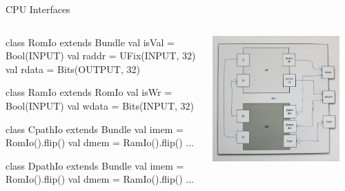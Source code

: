 \documentclass[xcolor=pdflatex,dvipsnames,table]{beamer}
\begin{document}
\begin{frame}[fragile]{CPU Interfaces}
\begin{columns}

\begin{scala}
class RomIo extends Bundle {
  val isVal = Bool(INPUT)
  val raddr = UFix(INPUT, 32)
  val rdata = Bits(OUTPUT, 32) 
}

class RamIo extends RomIo {
  val isWr  = Bool(INPUT)
  val wdata = Bits(INPUT, 32) 
}

class CpathIo extends Bundle {
  val imem = RomIo().flip()
  val dmem = RamIo().flip()
  ... }

class DpathIo extends Bundle {
  val imem = RomIo().flip()
  val dmem = RamIo().flip()
  ... }
\end{scala}


\begin{center}
\includegraphics[width=0.9\textwidth]{../tutorial/figs/cpu.png} 
\end{center}

\end{columns}
\end{frame}
\end{document}
